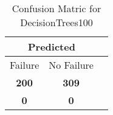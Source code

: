 \begin{table}[] 
\caption{Confusion Matric for DecisionTrees100} 
\label{Table: Prediction Accuracy-NoneDecisionTrees100DecisionTreesEKF-ignoreNone-None} 
\centering 
\begin{tabular} 
 {@{}ccc@{}} 
\toprule 
\multicolumn{2}{c}{\textbf{Predicted}}
 \\ \midrule 
\multicolumn{1}{|c|}{Failure} & 
\multicolumn{1}{c|}{No Failure}
 \\ \midrule 
\multicolumn{1}{|c|}{\color{green}\textbf{200}} & 
\multicolumn{1}{c|}{\color{green}\textbf{309}}
 \\ \midrule 
\multicolumn{1}{|c|}{\color{red}\textbf{0}} & 
\multicolumn{1}{c|}{\color{red}\textbf{0}}
 \\ \bottomrule 
\end{tabular} 
\end{table} 

